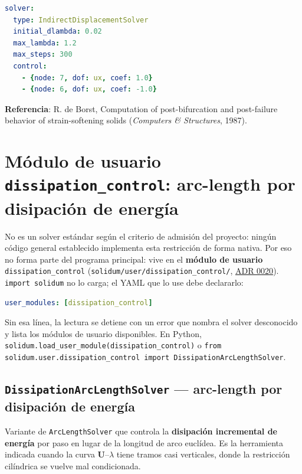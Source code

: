 \documentclass[11pt,oneside]{report}
\begin{document}
\begin{lstlisting}[language=yaml]
solver:
  type: IndirectDisplacementSolver
  initial_dlambda: 0.02
  max_lambda: 1.2
  max_steps: 300
  control:
    - {node: 7, dof: ux, coef: 1.0}
    - {node: 6, dof: ux, coef: -1.0}

\end{lstlisting}

\textbf{Referencia}: R. de Borst, \textquotedbl{}Computation of post-bifurcation and post-failure behavior of strain-softening solids\textquotedbl{} (\textit{Computers \& Structures}, 1987).

\section{Módulo de usuario \texttt{dissipation\_\allowbreak{}control}: arc-length por disipación de energía}

No es un solver estándar según el criterio de admisión del proyecto: ningún código general establecido implementa esta restricción de forma nativa. Por eso no forma parte del programa principal: vive en el \textbf{módulo de usuario} \texttt{dissipation\_\allowbreak{}control} (\texttt{solidum/\allowbreak{}user/\allowbreak{}dissipation\_\allowbreak{}control/\allowbreak{}}, \href{https://github.com/jretamav/solidum-fem/blob/main/docs/adr/0020-modulos-de-usuario.md}{ADR 0020}). \texttt{import solidum} no lo carga; el YAML que lo use debe declararlo:

\begin{lstlisting}[language=yaml]
user_modules: [dissipation_control]

\end{lstlisting}

Sin esa línea, la lectura se detiene con un error que nombra el solver desconocido y lista los módulos de usuario disponibles. En Python, \texttt{solidum.\allowbreak{}load\_\allowbreak{}user\_\allowbreak{}module(\textquotedbl{}dissipation\_\allowbreak{}control\textquotedbl{})} o \texttt{from solidum.\allowbreak{}user.\allowbreak{}dissipation\_\allowbreak{}control import DissipationArcLengthSolver}.

\subsection{\texttt{DissipationArcLengthSolver} --- arc-length por disipación de energía}

Variante de \texttt{ArcLengthSolver} que controla la \textbf{disipación incremental de energía} por paso en lugar de la longitud de arco euclídea. Es la herramienta indicada cuando la curva $\mathbf U$--$\lambda$ tiene tramos casi verticales, donde la restricción cilíndrica se vuelve mal condicionada.
\end{document}
